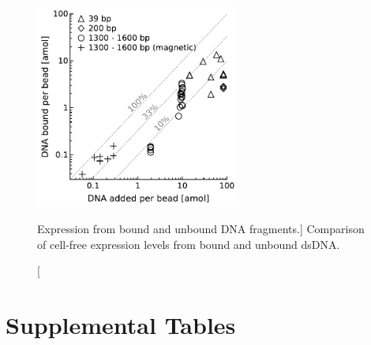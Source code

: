\documentclass[10pt]{article}
\begin{document}
\begin{figure}[ht!] %
\begin{center}
\includegraphics[width=0.6\textwidth]{figures/fig_dna.pdf}
\end{center} \label{sfig:single_concat}
\vspace*{-7mm} %
\caption %
    [\label{sfig:bulkconcat} Expression from bound and unbound DNA fragments.]
    { %
      Comparison of cell-free expression levels from bound and unbound dsDNA.
    } 
\end{figure}

\afterpage{\clearpage}  %
\newpage

\section*{Supplemental Tables}
\vspace{2cm}



\end{document}
